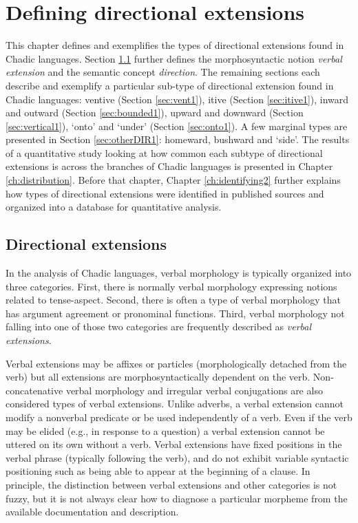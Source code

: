 \chapter{Defining directional extensions} \label{ch:identifying}

This chapter defines and exemplifies the types of directional extensions found in Chadic languages. Section \ref{sec:path} further defines the morphosyntactic notion \textit{verbal extension} and the semantic concept \textit{direction}. The remaining sections each describe and exemplify a particular sub-type of directional extension found in Chadic languages: ventive (Section \ref{sec:vent1}), itive (Section \ref{sec:itive1}), inward and outward (Section \ref{sec:bounded1}), upward and downward (Section \ref{sec:vertical1}), `onto' and `under' (Section \ref{sec:onto1}). A few marginal types are presented in Section \ref{sec:otherDIR1}: homeward, bushward and `side'. The results of a quantitative study looking at how common each subtype of directional extensions is across the branches of Chadic languages is presented in Chapter \ref{ch:distribution}. Before that chapter, Chapter \ref{ch:identifying2} further explains how types of directional extensions were identified in published sources and organized into a database for quantitative analysis. 

\section{Directional extensions} \label{sec:path}

In the analysis of Chadic languages, verbal morphology is typically organized into three categories. First, there is normally verbal morphology expressing notions related to tense-aspect. Second, there is often a type of verbal morphology that has argument agreement or pronominal functions. Third, verbal morphology not falling into one of those two categories are frequently described as \textit{verbal extensions}.

Verbal extensions may be affixes or particles (morphologically detached from the verb) but all extensions are morphosyntactically dependent on the verb. Non-concatenative verbal morphology and irregular verbal conjugations are also considered types of verbal extensions. Unlike adverbs, a verbal extension cannot modify a nonverbal predicate or be used independently of a verb. Even if the verb may be elided (e.g., in response to a question) a verbal extension cannot be uttered on its own without a verb. Verbal extensions have fixed positions in the verbal phrase (typically following the verb), and do not exhibit variable syntactic positioning such as being able to appear at the beginning of a clause. In principle, the distinction between verbal extensions and other categories is not fuzzy, but it is not always clear how to diagnose a particular morpheme from the available documentation and description.


